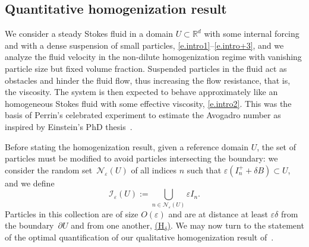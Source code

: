 \documentclass[JEP,XML,SOM,Unicode,published]{cedram}
\let\mathcal\mathscr
\newcommand{\Hd}{\hyperref[Hd]{\textup{(H$_\delta$)}}\xspace}
\theoremstyle{plain}
\theoremstyle{definition}
\newcommand{\e}{\varepsilon}
\newcommand{\R}{\mathbb R}
\newcommand{\Ic}{\mathcal I}
\newcommand{\Nc}{\mathcal N}
\begin{document}
\subsection{Quantitative homogenization result}\label{sec:homog}
We consider a steady Stokes fluid in a domain $U\subset\R^d$ with some internal forcing and with a dense suspension of small particles, \cf \eqref{e.intro1}--\eqref{e.intro+3}, and we analyze the fluid velocity in the non-dilute homogenization regime with vanishing particle size but fixed volume fraction. Suspended particles in the fluid act as obstacles and hinder the fluid flow, thus increasing the flow resistance, that is, the viscosity. The system is then expected to behave approximately like an homogeneous Stokes fluid with some effective viscosity, \cf \eqref{e.intro2}. This was the basis of Perrin's celebrated experiment to estimate the Avogadro number as inspired by Einstein's PhD thesis~\cite{Einstein-06}.

Before stating the homogenization result, given a reference domain $U$, the set of particles must be modified to avoid particles intersecting the boundary: we consider the random set~$\Nc_\e(U)$ of all indices $n$
such that $\e(I_n^++\delta B)\subset U$, and we define
\[\Ic_\e(U):=\bigcup_{n\in\Nc_\e(U)}\e I_n.\]
Particles in this collection are of size $O(\e)$ and are at distance at least $\e\delta$ from the boundary~$\partial U$ and from one another, \cf \Hd. We may now turn to the statement of the optimal quantification of our
qualitative homogenization result of~\cite{DG-19}.
\end{document}
